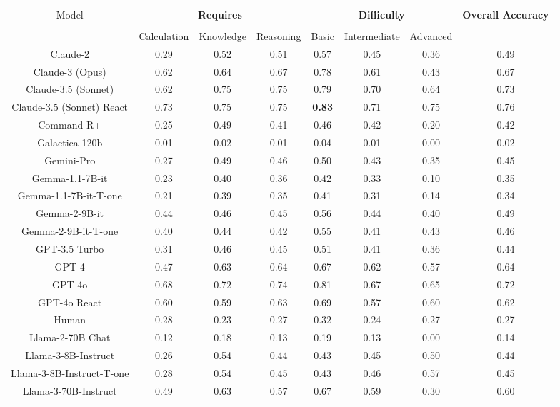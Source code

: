 \begin{tabular}{cccccccc}
\toprule
\multirow{3}{*}{Model} & \multicolumn{3}{c}{\textbf{Requires}} & \multicolumn{3}{c}{\textbf{Difficulty}} & \multirow{3}{*}{\textbf{Overall Accuracy}}\\\cmidrule(lr){2-4} \cmidrule(lr){5-7}\\
 & Calculation & Knowledge & Reasoning & Basic & Intermediate & Advanced &  \\
\midrule
Claude-2 & 0.29 & 0.52 & 0.51 & 0.57 & 0.45 & 0.36 & 0.49 \\
Claude-3 (Opus) & 0.62 & 0.64 & 0.67 & 0.78 & 0.61 & 0.43 & 0.67 \\
Claude-3.5 (Sonnet) & 0.62 & 0.75 & 0.75 & 0.79 & 0.70 & 0.64 & 0.73 \\
Claude-3.5 (Sonnet) React & 0.73 & 0.75 & 0.75 & \textbf{0.83} & 0.71 & 0.75 & 0.76 \\
Command-R+ & 0.25 & 0.49 & 0.41 & 0.46 & 0.42 & 0.20 & 0.42 \\
Galactica-120b & 0.01 & 0.02 & 0.01 & 0.04 & 0.01 & 0.00 & 0.02 \\
Gemini-Pro & 0.27 & 0.49 & 0.46 & 0.50 & 0.43 & 0.35 & 0.45 \\
Gemma-1.1-7B-it & 0.23 & 0.40 & 0.36 & 0.42 & 0.33 & 0.10 & 0.35 \\
Gemma-1.1-7B-it-T-one & 0.21 & 0.39 & 0.35 & 0.41 & 0.31 & 0.14 & 0.34 \\
Gemma-2-9B-it & 0.44 & 0.46 & 0.45 & 0.56 & 0.44 & 0.40 & 0.49 \\
Gemma-2-9B-it-T-one & 0.40 & 0.44 & 0.42 & 0.55 & 0.41 & 0.43 & 0.46 \\
GPT-3.5 Turbo & 0.31 & 0.46 & 0.45 & 0.51 & 0.41 & 0.36 & 0.44 \\
GPT-4 & 0.47 & 0.63 & 0.64 & 0.67 & 0.62 & 0.57 & 0.64 \\
GPT-4o & 0.68 & 0.72 & 0.74 & 0.81 & 0.67 & 0.65 & 0.72 \\
GPT-4o React & 0.60 & 0.59 & 0.63 & 0.69 & 0.57 & 0.60 & 0.62 \\
Human & 0.28 & 0.23 & 0.27 & 0.32 & 0.24 & 0.27 & 0.27 \\
Llama-2-70B Chat & 0.12 & 0.18 & 0.13 & 0.19 & 0.13 & 0.00 & 0.14 \\
Llama-3-8B-Instruct & 0.26 & 0.54 & 0.44 & 0.43 & 0.45 & 0.50 & 0.44 \\
Llama-3-8B-Instruct-T-one & 0.28 & 0.54 & 0.45 & 0.43 & 0.46 & 0.57 & 0.45 \\
Llama-3-70B-Instruct & 0.49 & 0.63 & 0.57 & 0.67 & 0.59 & 0.30 & 0.60 \\

\end{tabular}
